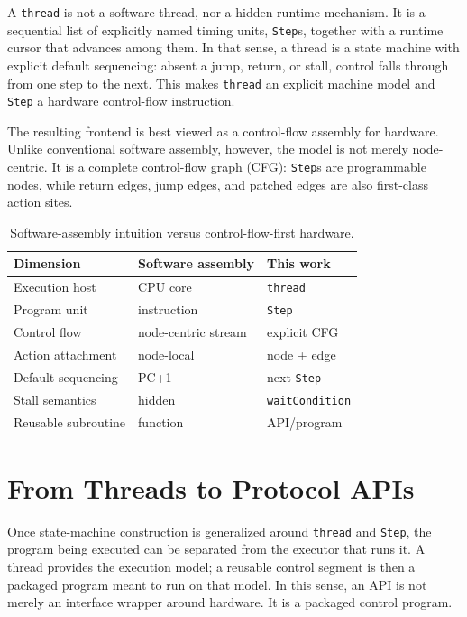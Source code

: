 \documentclass[conference]{IEEEtran}
\begin{document}
A \texttt{thread} is not a software thread, nor a hidden runtime mechanism. It is a sequential list of explicitly named timing units, \texttt{Step}s, together with a runtime cursor that advances among them. In that sense, a thread is a state machine with explicit default sequencing: absent a jump, return, or stall, control falls through from one step to the next. This makes \texttt{thread} an explicit machine model and \texttt{Step} a hardware control-flow instruction.

The resulting frontend is best viewed as a control-flow assembly for hardware. Unlike conventional software assembly, however, the model is not merely node-centric. It is a complete control-flow graph (CFG): \texttt{Step}s are programmable nodes, while return edges, jump edges, and patched edges are also first-class action sites.

\begin{table}[t]
\centering
\small
\begin{tabular}{@{}lll@{}}
\toprule
Dimension & Software assembly & This work \\
\midrule
Execution host & CPU core & \texttt{thread} \\
Program unit & instruction & \texttt{Step} \\
Control flow & node-centric stream & explicit CFG \\
Action attachment & node-local & node + edge \\
Default sequencing & PC+1 & next \texttt{Step} \\
Stall semantics & hidden & \texttt{waitCondition} \\
Reusable subroutine & function & API/program \\
\bottomrule
\end{tabular}
\caption{Software-assembly intuition versus control-flow-first hardware.}
\end{table}

\section{From Threads to Protocol APIs}
Once state-machine construction is generalized around \texttt{thread} and \texttt{Step}, the program being executed can be separated from the executor that runs it. A thread provides the execution model; a reusable control segment is then a packaged program meant to run on that model. In this sense, an API is not merely an interface wrapper around hardware. It is a packaged control program.
\end{document}
